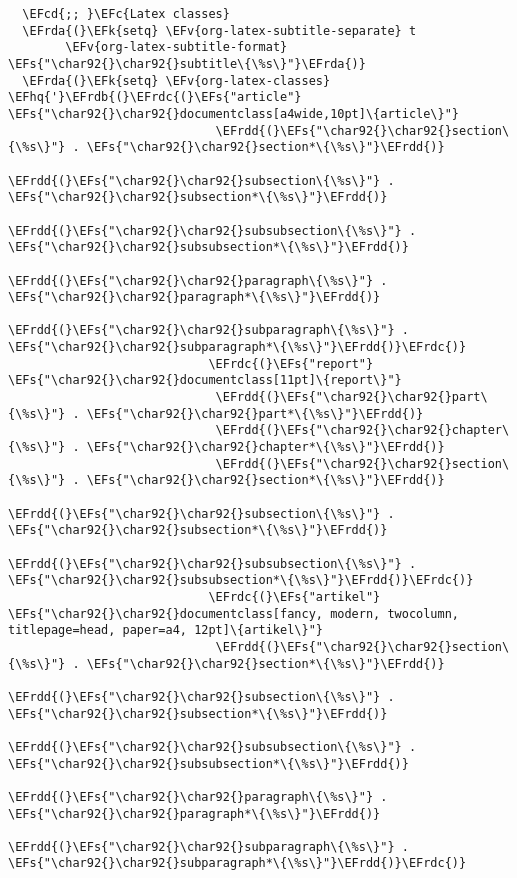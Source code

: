 \documentclass[a4wide,10pt]{article}
\newcommand{\EFc}[1]{\textcolor{EFc}{#1}} %
\newcommand{\EFcd}[1]{\textcolor{EFcd}{#1}} %
\newcommand{\EFs}[1]{\textcolor{EFs}{#1}} %
\newcommand{\EFk}[1]{\textcolor{EFk}{#1}} %
\newcommand{\EFv}[1]{\textcolor{EFv}{#1}} %
\newcommand{\EFhq}[1]{\textcolor{EFhq}{#1}} %
\newcommand{\EFrda}[1]{\textcolor{EFrda}{#1}} %
\newcommand{\EFrdb}[1]{\textcolor{EFrdb}{#1}} %
\newcommand{\EFrdc}[1]{\textcolor{EFrdc}{#1}} %
\newcommand{\EFrdd}[1]{\textcolor{EFrdd}{#1}} %
\begin{document}
\begin{Code}
\begin{Verbatim}
  \EFcd{;; }\EFc{Latex classes}
  \EFrda{(}\EFk{setq} \EFv{org-latex-subtitle-separate} t
        \EFv{org-latex-subtitle-format} \EFs{"\char92{}\char92{}subtitle\{\%s\}"}\EFrda{)}
  \EFrda{(}\EFk{setq} \EFv{org-latex-classes} \EFhq{'}\EFrdb{(}\EFrdc{(}\EFs{"article"} \EFs{"\char92{}\char92{}documentclass[a4wide,10pt]\{article\}"}
                             \EFrdd{(}\EFs{"\char92{}\char92{}section\{\%s\}"} . \EFs{"\char92{}\char92{}section*\{\%s\}"}\EFrdd{)}
                             \EFrdd{(}\EFs{"\char92{}\char92{}subsection\{\%s\}"} . \EFs{"\char92{}\char92{}subsection*\{\%s\}"}\EFrdd{)}
                             \EFrdd{(}\EFs{"\char92{}\char92{}subsubsection\{\%s\}"} . \EFs{"\char92{}\char92{}subsubsection*\{\%s\}"}\EFrdd{)}
                             \EFrdd{(}\EFs{"\char92{}\char92{}paragraph\{\%s\}"} . \EFs{"\char92{}\char92{}paragraph*\{\%s\}"}\EFrdd{)}
                             \EFrdd{(}\EFs{"\char92{}\char92{}subparagraph\{\%s\}"} . \EFs{"\char92{}\char92{}subparagraph*\{\%s\}"}\EFrdd{)}\EFrdc{)}
                            \EFrdc{(}\EFs{"report"} \EFs{"\char92{}\char92{}documentclass[11pt]\{report\}"}
                             \EFrdd{(}\EFs{"\char92{}\char92{}part\{\%s\}"} . \EFs{"\char92{}\char92{}part*\{\%s\}"}\EFrdd{)}
                             \EFrdd{(}\EFs{"\char92{}\char92{}chapter\{\%s\}"} . \EFs{"\char92{}\char92{}chapter*\{\%s\}"}\EFrdd{)}
                             \EFrdd{(}\EFs{"\char92{}\char92{}section\{\%s\}"} . \EFs{"\char92{}\char92{}section*\{\%s\}"}\EFrdd{)}
                             \EFrdd{(}\EFs{"\char92{}\char92{}subsection\{\%s\}"} . \EFs{"\char92{}\char92{}subsection*\{\%s\}"}\EFrdd{)}
                             \EFrdd{(}\EFs{"\char92{}\char92{}subsubsection\{\%s\}"} . \EFs{"\char92{}\char92{}subsubsection*\{\%s\}"}\EFrdd{)}\EFrdc{)}
                            \EFrdc{(}\EFs{"artikel"} \EFs{"\char92{}\char92{}documentclass[fancy, modern, twocolumn, titlepage=head, paper=a4, 12pt]\{artikel\}"}
                             \EFrdd{(}\EFs{"\char92{}\char92{}section\{\%s\}"} . \EFs{"\char92{}\char92{}section*\{\%s\}"}\EFrdd{)}
                             \EFrdd{(}\EFs{"\char92{}\char92{}subsection\{\%s\}"} . \EFs{"\char92{}\char92{}subsection*\{\%s\}"}\EFrdd{)}
                             \EFrdd{(}\EFs{"\char92{}\char92{}subsubsection\{\%s\}"} . \EFs{"\char92{}\char92{}subsubsection*\{\%s\}"}\EFrdd{)}
                             \EFrdd{(}\EFs{"\char92{}\char92{}paragraph\{\%s\}"} . \EFs{"\char92{}\char92{}paragraph*\{\%s\}"}\EFrdd{)}
                             \EFrdd{(}\EFs{"\char92{}\char92{}subparagraph\{\%s\}"} . \EFs{"\char92{}\char92{}subparagraph*\{\%s\}"}\EFrdd{)}\EFrdc{)}

\end{Verbatim}
\end{Code}
\end{document}
